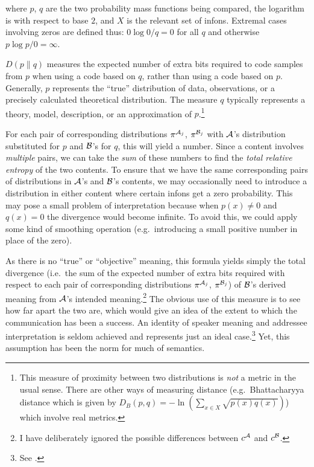 \noindent where $p$, $q$ are the two probability mass functions being compared, the logarithm is with respect to base $2$, and $X$ is the relevant set of infons. Extremal cases involving zeros are defined thus: $0 \log 0/q = 0$ for all $q$ and otherwise $p \log p/0 = \infty$. 

$D(p \parallel q)$ measures the expected number of extra bits required to code samples from $p$ when using a code based on $q$, rather than using a code based on $p$. Generally, $p$ represents the ``true'' distribution of data, observations, or a precisely calculated theoretical distribution. The measure $q$ typically represents a theory, model, description, or an approximation of $p$.\footnote{This measure of proximity between two distributions is \emph{not} a metric in the usual sense. There are other ways of measuring distance (e.g.\ Bhattacharyya distance which is given by $D_B(p, q) = - \ln(\sum_{x \in X}\sqrt{p(x)q(x)})$) which involve real metrics.}

For each pair of corresponding distributions $\pi^{{\cal A}_j}$, $\pi^{{\cal B}_j}$ with $\cal A$'s distribution substituted for $p$ and $\cal B$'s for $q$, this will yield a number. Since a content involves \emph{multiple} pairs, we can take the \emph{sum} of these numbers to find the \emph{total relative entropy} of the two contents. To ensure that we have the same corresponding pairs of distributions in $\cal A$'s and $\cal B$'s contents, we may occasionally need to introduce a distribution in either content where certain infons get a zero probability. This may pose a small problem of interpretation because when $p(x) \not = 0$ and $q(x) = 0$ the divergence would become infinite. To avoid this, we could apply some kind of smoothing operation (e.g.\ introducing a small positive number in place of the zero). 

As there is no ``true'' or ``objective'' meaning, this formula yields simply the total divergence (i.e.\ the sum of the expected number of extra bits required with respect to each pair of corresponding distributions  $\pi^{{\cal A}_j}$, $\pi^{{\cal B}_j}$) of $\cal B$'s derived meaning from $\cal A$'s intended meaning.\footnote{I have deliberately ignored the possible differences between $c^{\cal A}$ and $c^{\cal B}$.} The obvious use of this measure is to see how far apart the two are, which would give an idea of the extent to which the  communication has been a success. An identity of speaker meaning and addressee interpretation is seldom achieved and represents just an ideal case.\footnote{See \citet{parikh:ul,parikh:rs,parikh:le}.} Yet, this assumption has been the norm for much of semantics.


